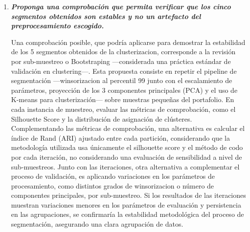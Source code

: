 \documentclass[10pt,a4paper]{article}
\begin{document}
\begin{enumerate}
Desde un punto de vista teórico, existen algoritmos que podrían adaptarse mejor a la naturaleza mixta de los datos analizados; entre ellos, K-Prototypes y K-Modes se perfilan como alternativas preliminares a considerar.
En relación a K-Means, \cite{jackson2022} reconoce dicha limitación en su propuesta y señala explícitamente que ``K-Means clustering, que constituye el núcleo del marco propuesto, segmenta datos exclusivamente sobre la base de la distancia euclidiana y, por lo tanto, no es aplicable a datos categóricos''. Asimismo, el autor sugiere que la incorporación de ``variaciones de K-Means'' podría resultar útil para optimizar la solución.
No obstante, pese a las ventajas que ofrecen estas variaciones, el enfoque desarrollado —basado en la winsorización al percentil 99, la proyección sobre tres componentes principales (PCA) y la posterior aplicación de K-means— constituye una alternativa robusta, tal como se sugiere en el trabajo metodológico de Jackson y responde al objetivo general de mitigar la sensibilidad del algoritmo K-means frente a la escala y la naturaleza de los datos.
\\[0.25cm]
    \item \textbf{\textit{Proponga una comprobación que permita verificar que los cinco segmentos obtenidos son estables y no un artefacto del preprocesamiento escogido.}}

Una comprobación posible, que podría aplicarse para demostrar la estabilidad de los 5 segmentos obtenidos de la clusterizacion, corresponde a la revisión por sub-muestreo o Bootstraping ---considerada una práctica estándar de validación en clustering---. Esta propuesta consiste en repetir el pipeline de segmentación ---winsorizacion al percentil 99 junto con el escalamiento de parámetros, proyección de los 3 componentes principales (PCA) y el uso de K-means para clusterización--- sobre muestras pequeñas del portafolio. En cada instancia de muestreo, evaluar las métricas de comprobación, como el Silhouette Score y la distribución de asignación de clústeres.
Complementando las métricas de comprobación, una alternativa es calcular el índice de Rand (ARI) ajustado entre cada partición, considerando que la metodología utilizada usa únicamente el silhouette score y el método de codo por cada iteración, no considerando una evaluación de sensibilidad a nivel de sub-muestreos. 
Junto con las iteraciones, otra alternativa a complementar el proceso de validación, es aplicando variaciones en los parámetros de procesamiento, como distintos grados de winsorizacion o número de componentes principales, por sub-muestreo.
Si los resultados de las iteraciones muestran variaciones menores en los parámetros de evaluación y persistencia en las agrupaciones, se confirmaría la estabilidad metodológica del proceso de segmentación, asegurando una clara agrupación de datos.

\end{enumerate}
\end{document}

